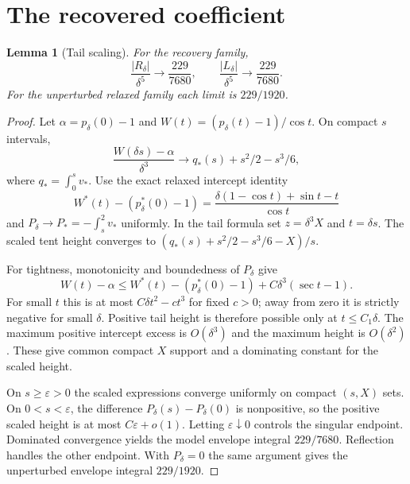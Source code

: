 \documentclass[11pt]{article}
\newtheorem{lemma}{Lemma}
\begin{document}
\section*{The recovered coefficient}
\begin{lemma}[Tail scaling]
For the recovery family,
\[
 \frac{|R_\delta|}{\delta^5}\longrightarrow\frac{229}{7680},\qquad
 \frac{|L_\delta|}{\delta^5}\longrightarrow\frac{229}{7680}.
\]
For the unperturbed relaxed family each limit is $229/1920$.
\end{lemma}
\begin{proof}
Let $\alpha=p_\delta(0)-1$ and $W(t)=(p_\delta(t)-1)/\cos t$. On compact $s$ intervals,
\[
 \frac{W(\delta s)-\alpha}{\delta^3}
 \longrightarrow q_*(s)+s^2/2-s^3/6,
\]
where $q_*=\int_0^s v_*$. Use the exact relaxed intercept identity
\[
 W^*(t)-(p_\delta^*(0)-1)=\frac{\delta(1-\cos t)+\sin t-t}{\cos t}
\]
and $P_\delta\to P_*=-\int_s^2v_*$ uniformly. In the tail formula set $z=\delta^3X$ and $t=\delta s$. The scaled tent height converges to $(q_*(s)+s^2/2-s^3/6-X)/s$.

For tightness, monotonicity and boundedness of $P_\delta$ give
\[
 W(t)-\alpha\le W^*(t)-(p_\delta^*(0)-1)+C\delta^3(\sec t-1).
\]
For small $t$ this is at most $C\delta t^2-c t^3$ for fixed $c>0$; away from zero it is strictly negative for small $\delta$. Positive tail height is therefore possible only at $t\le C_1\delta$. The maximum positive intercept excess is $O(\delta^3)$ and the maximum height is $O(\delta^2)$. These give common compact $X$ support and a dominating constant for the scaled height.

On $s\ge\varepsilon>0$ the scaled expressions converge uniformly on compact $(s,X)$ sets. On $0<s<\varepsilon$, the difference $P_\delta(s)-P_\delta(0)$ is nonpositive, so the positive scaled height is at most $C\varepsilon+o(1)$. Letting $\varepsilon\downarrow0$ controls the singular endpoint. Dominated convergence yields the model envelope integral $229/7680$. Reflection handles the other endpoint. With $P_\delta=0$ the same argument gives the unperturbed envelope integral $229/1920$.
\end{proof}
\end{document}
